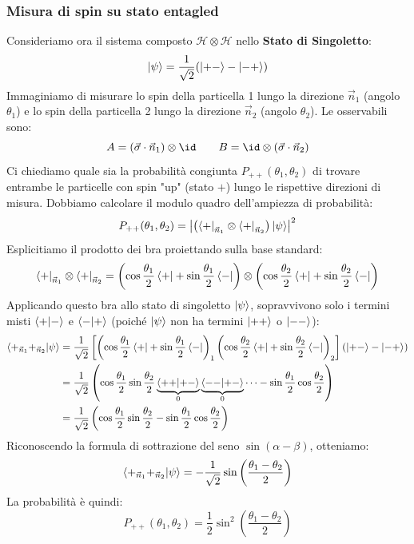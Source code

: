 \subsubsection{Misura di spin su stato entagled}
Consideriamo ora il sistema composto \(\mathcal{H} \otimes \mathcal{H}\) nello \textbf{Stato di Singoletto}:
\[
    \ket{\psi} = \frac{1}{\sqrt{2}} (\ket{+-} - \ket{-+})
\]
Immaginiamo di misurare lo spin della particella 1 lungo la direzione \(\vec{n}_1\) (angolo \(\theta_1\)) e lo spin della particella 2 lungo la direzione \(\vec{n}_2\) (angolo \(\theta_2\)).
Le osservabili sono:
\[
    A = (\vec{\sigma} \cdot \vec{n}_1) \otimes \id \qquad B = \id \otimes (\vec{\sigma} \cdot \vec{n}_2)
\]
Ci chiediamo quale sia la probabilità congiunta \(P_{++}(\theta_1, \theta_2)\) di trovare entrambe le particelle con spin "up" (stato \(+\)) lungo le rispettive direzioni di misura. Dobbiamo calcolare il modulo quadro dell'ampiezza di probabilità:
\[
    P_{++}(\theta_1, \theta_2) = \left| \left( \bra{+}_{\vec{n}_1} \otimes \bra{+}_{\vec{n}_2} \right) \ket{\psi} \right|^2
\]
Esplicitiamo il prodotto dei bra proiettando sulla base standard:
\[
    \bra{+}_{\vec{n}_1} \otimes \bra{+}_{\vec{n}_2} = \left( \cos\frac{\theta_1}{2}\bra{+} + \sin\frac{\theta_1}{2}\bra{-} \right) \otimes \left( \cos\frac{\theta_2}{2}\bra{+} + \sin\frac{\theta_2}{2}\bra{-} \right)
\]
Applicando questo bra allo stato di singoletto \(\ket{\psi}\), sopravvivono solo i termini misti \(\braket{+}{-}\) e \(\braket{-}{+}\) (poiché \(\ket{\psi}\) non ha termini \(\ket{++}\) o \(\ket{--}\)):
\begin{align*}
    \braket{+_{\vec{n}_1} +_{\vec{n}_2}}{\psi} &= \frac{1}{\sqrt{2}} \left[ \left( \cos\frac{\theta_1}{2}\bra{+} + \sin\frac{\theta_1}{2}\bra{-} \right)_1 \left( \cos\frac{\theta_2}{2}\bra{+} + \sin\frac{\theta_2}{2}\bra{-} \right)_2 \right] (\ket{+-} - \ket{-+}) \\
    &= \frac{1}{\sqrt{2}} \left( \cos\frac{\theta_1}{2}\sin\frac{\theta_2}{2} \underbrace{\braket{++}{+-}}_{0} \underbrace{\braket{--}{+-}}_{0} \dots - \sin\frac{\theta_1}{2}\cos\frac{\theta_2}{2} \right) \\
    &= \frac{1}{\sqrt{2}} \left( \cos\frac{\theta_1}{2}\sin\frac{\theta_2}{2} - \sin\frac{\theta_1}{2}\cos\frac{\theta_2}{2} \right)
\end{align*}
Riconoscendo la formula di sottrazione del seno \(\sin(\alpha-\beta)\), otteniamo:
\[
    \braket{+_{\vec{n}_1} +_{\vec{n}_2}}{\psi} = -\frac{1}{\sqrt{2}} \sin\left( \frac{\theta_1 - \theta_2}{2} \right)
\]
La probabilità è quindi:
\begin{equation}
    P_{++}(\theta_1, \theta_2) = \frac{1}{2} \sin^2\left( \frac{\theta_1 - \theta_2}{2} \right)
\end{equation}

